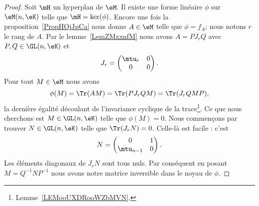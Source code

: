 \begin{proof}
    Soit \( \mH\) un hyperplan de \( \eM\). Il existe une forme linéaire \( \phi\) sur \( \eM(n,\eK)\) telle que \( \mH=\ker(\phi)\). Encore une fois la proposition~\ref{PropHOjJpCa} nous donne \( A\in \eM\) telle que \( \phi=f_A\); nous notons \( r\) le rang de \( A\). Par le lemme~\ref{LemZMxxnfM} nous avons \( A=PJ_rQ\) avec \( P,Q\in \GL(n,\eK)\) et
    \begin{equation}
        J_r=\begin{pmatrix}
            \mtu_r    &   0    \\
            0    &   0
        \end{pmatrix}.
    \end{equation}
    Pour tout \( M\in \eM\) nous avons
    \begin{equation}
        \phi(M)=\Tr(AM)=\Tr(PJ_rQM)=\Tr(J_rQMP),
    \end{equation}
la dernière égalité découlant de l'invariance cyclique de la trace\footnote{Lemme~\ref{LEMooUXDRooWZbMVN}.}. Ce que nous cherchons est \( M\in \GL(n,\eK)\) telle que \( \phi(M)=0\). Nous commençons par trouver \( N\in\GL(n,\eK)\) telle que \( \Tr(J_rN)=0\). Celle-là est facile : c'est
    \begin{equation}
        N=\begin{pmatrix}
            0    &   1    \\
            \mtu_{n-1}    &   0
        \end{pmatrix}.
    \end{equation}
    Les éléments diagonaux de \( J_rN\) sont tous nuls. Par conséquent en posant \( M=Q^{-1}NP^{-1}\) nous avons notre matrice inversible dans le noyau de \( \phi\).
\end{proof}


